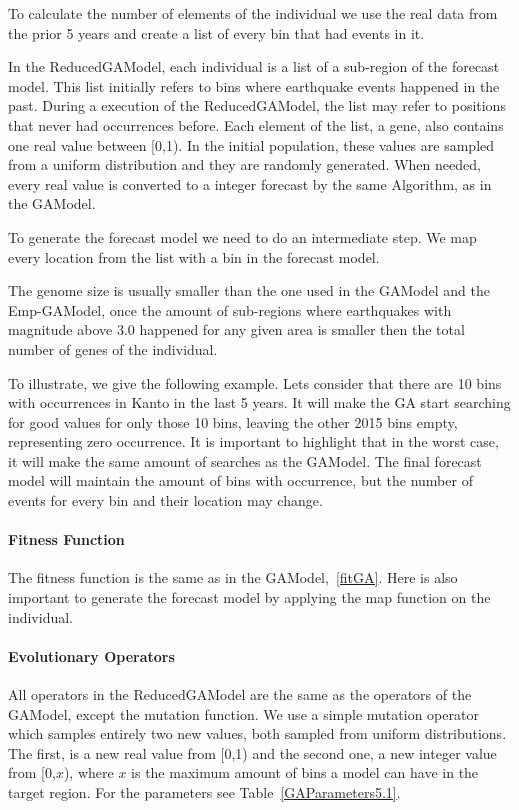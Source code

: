 To calculate the number of elements of the individual we use the real data from the prior 5 years and create a list of every bin that had events in it.

In the ReducedGAModel, each individual is a list of a sub-region of the forecast model. This list initially refers to bins where earthquake events happened in the past. During a execution of the ReducedGAModel, the list may refer to positions that never had occurrences before. Each element of the list, a gene, also contains one real value between [0,1). In the initial population, these values are sampled from a uniform distribution and they are randomly generated. When needed, every real value is converted to a integer forecast by the same Algorithm, as in the GAModel.

To generate the forecast model we need to do an intermediate step. We map every location from the list with a bin in the forecast model.

The genome size is usually smaller than the one used in the GAModel and the Emp-GAModel, once the amount of sub-regions where earthquakes with magnitude above 3.0 happened for any given area is smaller then the total number of genes of the individual.

To illustrate, we give the following example. Lets consider that there are 10 bins with occurrences in Kanto in the last 5 years. It will make the GA start searching for good values for only those 10 bins, leaving the other 2015 bins empty, representing zero occurrence. It is important to highlight that in the worst case, it will make the same amount of searches as the GAModel. The final forecast model will maintain the amount of bins with occurrence, but the number of events for every bin and their location may change.

\paragraph{Fitness Function}
The fitness function is the same as in the GAModel,~\ref{fitGA}. Here is also important to generate the forecast model by applying the map function on the individual.

\paragraph{Evolutionary Operators}\label{ReducedOperators}
All operators in the ReducedGAModel are the same as the operators of the GAModel, except the mutation function. We use a simple mutation operator which samples entirely two new values, both sampled from uniform distributions. The first, is a new real value from [0,1) and the second one, a new integer value from [0,$x$), where $x$ is the maximum amount of bins a model can have in the target region. For the parameters see Table~\ref{GAParameters5.1}.

